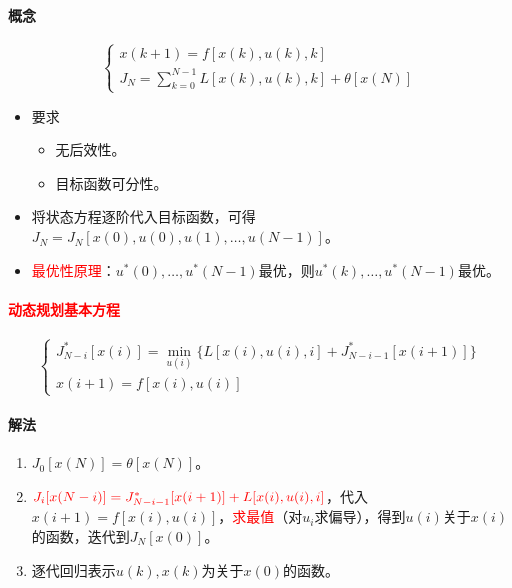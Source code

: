 \documentclass[
12pt, %
a4paper, 
oneside, %
]{scrartcl}
\begin{document}
\paragraph{概念}
$$ \begin{cases} x(k + 1) = f[x(k), u(k), k] \\ J_N = \sum_{k = 0}^{N - 1} L[x(k), u(k), k] + \theta[x(N)] \end{cases} $$
\begin{itemize}
\item 要求
\begin{itemize}
\item 无后效性。
\item 目标函数可分性。
\end{itemize}
\item 将状态方程逐阶代入目标函数，可得$ J_N = J_N[x(0), u(0), u(1), \dots, u(N - 1)] $。
\item \textcolor{red}{最优性原理}：$ u^*(0), \dots, u^*(N - 1) $最优，则$ u^*(k), \dots, u^*(N - 1) $最优。
\end{itemize}
\paragraph{\textcolor{red}{动态规划基本方程}}
$$ \begin{cases} J_{N - i}^*[x(i)] = \min_{u(i)} \{L[x(i), u(i), i] + J_{N - i - 1}^*[x(i + 1)]\} \\ x(i + 1) = f[x(i), u(i)] \end{cases} $$
\paragraph{解法}
\begin{enumerate}
\item $ J_0[x(N)] = \theta[x(N)] $。
\item $ \textcolor{red}{J_i[x(N - i)] = J_{N - i - 1}^*[x(i + 1)] + L[x(i), u(i), i]} $，代入$ x(i + 1) = f[x(i), u(i)] $，\textcolor{red}{求最值}（对$ u_i $求偏导），得到$ u(i) $关于$ x(i) $的函数，迭代到$ J_N[x(0)] $。
\item 逐代回归表示$ u(k), x(k) $为关于$ x(0) $的函数。
\end{enumerate}
\end{document}
